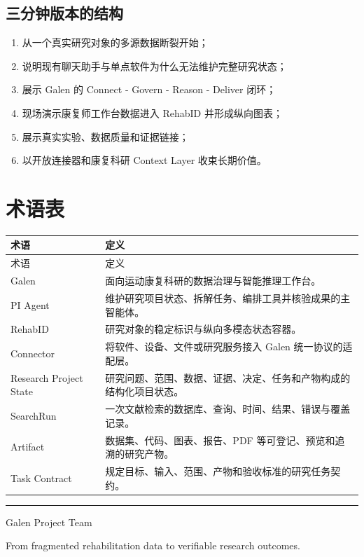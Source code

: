 \documentclass[11pt,a4paper,UTF8]{ctexart}
\begin{document}
\subsection{三分钟版本的结构}

\begin{enumerate}
  \item 从一个真实研究对象的多源数据断裂开始；
  \item 说明现有聊天助手与单点软件为什么无法维护完整研究状态；
  \item 展示 Galen 的 Connect - Govern - Reason - Deliver 闭环；
  \item 现场演示康复师工作台数据进入 RehabID 并形成纵向图表；
  \item 展示真实实验、数据质量和证据链接；
  \item 以开放连接器和康复科研 Context Layer 收束长期价值。
\end{enumerate}

\section{术语表}

\begin{longtable}{@{}L{3.6cm}L{12.0cm}@{}}
\toprule
术语 & 定义 \\
\midrule
\endfirsthead
\toprule
术语 & 定义 \\
\midrule
\endhead
Galen & 面向运动康复科研的数据治理与智能推理工作台。 \\
PI Agent & 维护研究项目状态、拆解任务、编排工具并核验成果的主智能体。 \\
RehabID & 研究对象的稳定标识与纵向多模态状态容器。 \\
Connector & 将软件、设备、文件或研究服务接入 Galen 统一协议的适配层。 \\
Research Project State & 研究问题、范围、数据、证据、决定、任务和产物构成的结构化项目状态。 \\
SearchRun & 一次文献检索的数据库、查询、时间、结果、错误与覆盖记录。 \\
Artifact & 数据集、代码、图表、报告、PDF 等可登记、预览和追溯的研究产物。 \\
Task Contract & 规定目标、输入、范围、产物和验收标准的研究任务契约。 \\
\bottomrule
\end{longtable}

\vfill
\begin{center}
\color{GalenLine}\rule{0.72\textwidth}{0.4pt}\par
\vspace{4mm}
{\sffamily\small\color{GalenMuted}Galen Project Team}\par
{\sffamily\footnotesize\color{GalenMuted}From fragmented rehabilitation data to verifiable research outcomes.}
\end{center}
\end{document}
